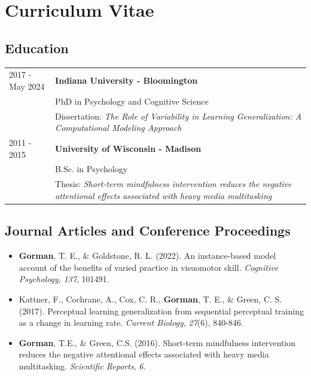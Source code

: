 \documentclass[
  11pt,
  letterpaper,
]{article}
\begin{document}
\newpage{}


\section{Curriculum Vitae}\label{curriculum-vitae}

\subsection*{Education}\label{education}

\begin{tabular}{p{} p{}}
2017 - May 2024 & \textbf{Indiana University - Bloomington} \\
& PhD in Psychology and Cognitive Science \\ 
& Dissertation: \textit{The Role of Variability in Learning Generalization: A Computational Modeling Approach}\\
2011 - 2015 & \textbf{University of Wisconsin - Madison} \\
& B.Sc. in Psychology \\
& Thesis: \textit{Short-term mindfulness intervention reduces the negative attentional effects associated with heavy media multitasking} \\
\end{tabular}

\subsection*{Journal Articles and Conference
Proceedings}\label{journal-articles-and-conference-proceedings}

\begin{itemize}
\item
  \textbf{Gorman}, T. E., \& Goldstone, R. L. (2022). An instance-based
  model account of the benefits of varied practice in visuomotor skill.
  \emph{Cognitive Psychology}, \emph{137}, 101491.
\item
  Kattner, F., Cochrane, A., Cox, C. R., \textbf{Gorman}, T. E., \&
  Green, C. S. (2017). Perceptual learning generalization from
  sequential perceptual training as a change in learning rate.
  \emph{Current Biology}, \emph{27}(6), 840-846.
\item
  \textbf{Gorman}, T.E., \& Green, C.S. (2016). Short-term mindfulness
  intervention reduces the negative attentional effects associated with
  heavy media multitasking. \emph{Scientific Reports}, \emph{6}.
\end{itemize}
\end{document}
